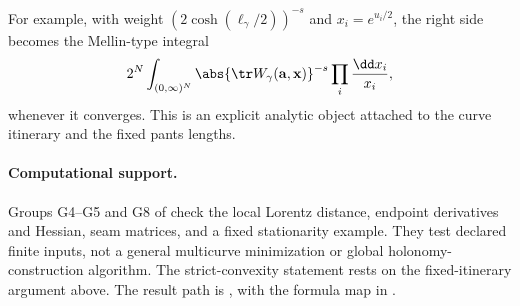 For example, with weight $(2\cosh(\ell_\gamma/2))^{-s}$ and
$x_i=e^{u_i/2}$, the right side becomes the Mellin-type integral
\begin{equation}
 2^N\int_{(0,\infty)^N}
 \abs{\tr W_\gamma(\mathbf a,\mathbf x)}^{-s}
             \prod_i\frac{\dd x_i}{x_i},
 \label{eq:mellin}
\end{equation}
whenever it converges. This is an explicit analytic object attached to the
curve itinerary and the fixed pants lengths.

\paragraph{Computational support.}
Groups G4--G5 and G8 of
 check the local Lorentz
distance, endpoint derivatives and Hessian, seam matrices, and a fixed
stationarity example. They test declared finite inputs, not a general
multicurve minimization or global holonomy-construction algorithm.
The strict-convexity statement rests on the fixed-itinerary argument
above. The result path is ,
with the formula map in .
